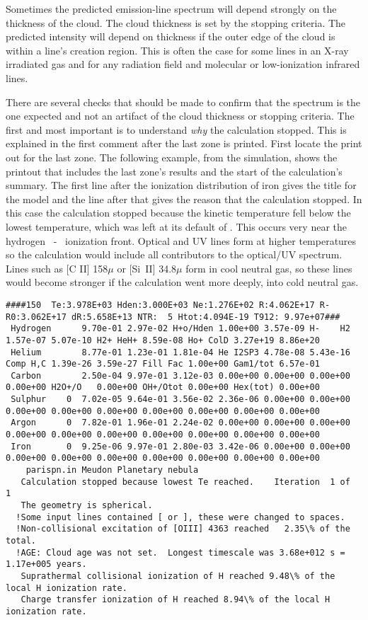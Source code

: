 Sometimes the predicted emission-line spectrum will depend strongly on
the thickness of the cloud.
The cloud thickness is set by the stopping
criteria.
The predicted intensity will depend on thickness if the outer
edge of the cloud is within a line's creation region.
This is often the
case for some lines in an X-ray irradiated gas and for any radiation field
and molecular or low-ionization infrared lines.

There are several checks that should be made to confirm that the spectrum
is the one expected and not an artifact of the cloud thickness or stopping
criteria.
The first and most important is to understand \emph{why} the calculation
stopped.
This is explained in the first comment after the last zone is
printed.
First locate the print out for the last zone.
The following
example, from the  simulation, shows the printout that includes
the last zone's results and the start of the calculation's summary.
The
first line after the ionization distribution of iron gives the title for
the model and the line after that gives the reason that the calculation
stopped.
In this case the calculation stopped because the kinetic
temperature fell below the lowest temperature, which was left at its
default of \TEMPSTOPDEFAULT.
This occurs very near the hydrogen \hplus\ - \hO\ ionization front.
Optical and UV lines form at higher temperatures so the calculation would
include all contributors to the optical/UV spectrum.
Lines such as [C II]
158$\mu$ or [Si~II] 34.8$\mu$ form in cool neutral gas,
so these lines would become
stronger if the calculation went more deeply, into cold neutral gas.

{\setverbatimfontsize{\tiny}
\begin{verbatim}
####150  Te:3.978E+03 Hden:3.000E+03 Ne:1.276E+02 R:4.062E+17 R-R0:3.062E+17 dR:5.658E+13 NTR:  5 Htot:4.094E-19 T912: 9.97e+07###
 Hydrogen      9.70e-01 2.97e-02 H+o/Hden 1.00e+00 3.57e-09 H-    H2 1.57e-07 5.07e-10 H2+ HeH+ 8.59e-08 Ho+ ColD 3.27e+19 8.86e+20
 Helium        8.77e-01 1.23e-01 1.81e-04 He I2SP3 4.78e-08 5.43e-16 Comp H,C 1.39e-26 3.59e-27 Fill Fac 1.00e+00 Gam1/tot 6.57e-01
 Carbon        2.50e-04 9.97e-01 3.12e-03 0.00e+00 0.00e+00 0.00e+00 0.00e+00 H2O+/O   0.00e+00 OH+/Otot 0.00e+00 Hex(tot) 0.00e+00
 Sulphur    0  7.02e-05 9.64e-01 3.56e-02 2.36e-06 0.00e+00 0.00e+00 0.00e+00 0.00e+00 0.00e+00 0.00e+00 0.00e+00 0.00e+00 0.00e+00
 Argon      0  7.82e-01 1.96e-01 2.24e-02 0.00e+00 0.00e+00 0.00e+00 0.00e+00 0.00e+00 0.00e+00 0.00e+00 0.00e+00 0.00e+00 0.00e+00
 Iron       0  9.25e-06 9.97e-01 2.80e-03 3.42e-06 0.00e+00 0.00e+00 0.00e+00 0.00e+00 0.00e+00 0.00e+00 0.00e+00 0.00e+00 0.00e+00
    parispn.in Meudon Planetary nebula
   Calculation stopped because lowest Te reached.    Iteration  1 of  1
   The geometry is spherical.
  !Some input lines contained [ or ], these were changed to spaces.
  !Non-collisional excitation of [OIII] 4363 reached   2.35\% of the total.
  !AGE: Cloud age was not set.  Longest timescale was 3.68e+012 s = 1.17e+005 years.
   Suprathermal collisional ionization of H reached 9.48\% of the local H ionization rate.
   Charge transfer ionization of H reached 8.94\% of the local H ionization rate.
\end{verbatim}
}

